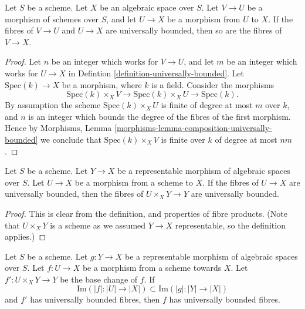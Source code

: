 \begin{lemma}
\label{lemma-composition-universally-bounded}
Let $S$ be a scheme. Let $X$ be an algebraic space over $S$.
Let $V \to U$ be a morphism of schemes over $S$, and let
$U \to X$ be a morphism from $U$ to $X$. If the fibres of
$V \to U$ and $U \to X$ are universally bounded, then so
are the fibres of $V \to X$.
\end{lemma}

\begin{proof}
Let $n$ be an integer which works for $V \to U$, and let $m$ be
an integer which works for $U \to X$ in
Defintion \ref{definition-universally-bounded}.
Let $\text{Spec}(k) \to X$ be a morphism, where $k$ is a field.
Consider the morphisms
$$
\text{Spec}(k) \times_X V
\longrightarrow
\text{Spec}(k) \times_X U
\longrightarrow
\text{Spec}(k).
$$
By assumption the scheme $\text{Spec}(k) \times_X U$
is finite of degree at most $m$ over $k$, and $n$ is an integer which
bounds the degree of the fibres of the first morphism. Hence by
Morphisms, Lemma \ref{morphisms-lemma-composition-universally-bounded}
we conclude that $\text{Spec}(k) \times_X V$ is finite over $k$
of degree at most $nm$.
\end{proof}

\begin{lemma}
\label{lemma-base-change-universally-bounded}
Let $S$ be a scheme.
Let $Y \to X$ be a representable morphism of algebraic spaces over $S$.
Let $U \to X$ be a morphism from a scheme to $X$.
If the fibres of $U \to X$ are universally bounded, then the fibres
of $U \times_X Y \to Y$ are universally bounded.
\end{lemma}

\begin{proof}
This is clear from the definition, and properties of fibre products.
(Note that $U \times_X Y$ is a scheme
as we assumed $Y \to X$ representable, so the definition applies.)
\end{proof}

\begin{lemma}
\label{lemma-descent-universally-bounded}
Let $S$ be a scheme. Let $g : Y \to X$ be a representable morphism of
algebraic spaces over $S$. Let $f : U \to X$ be a morphism from a scheme
towards $X$. Let $f' : U \times_X Y \to Y$ be the base change of $f$.
If
$$
\text{Im}(|f| : |U| \to |X|) \subset \text{Im}(|g| : |Y| \to |X|)
$$
and $f'$ has universally bounded fibres, then $f$ has universally
bounded fibres.
\end{lemma}

